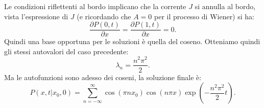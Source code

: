 \noindent
\begin{exmp}
    Le condizioni riflettenti al bordo implicano che la corrente $J$ si annulla al bordo, vista l'espressione di $J$ (e ricordando che $A=0$ per il processo di Wiener) si ha:
    \[
	\frac{\partial P(0,t) }{\partial x} = \frac{\partial P(1,t) }{\partial x} = 0
    .\] 
    Quindi una base opportuna per le soluzioni è quella del coseno. Otteniamo quindi gli stessi autovalori del caso precedente:
    \[
        \lambda_n = \frac{n^2\pi^2}{2}
    .\] 
    Ma le autofunzioni sono adesso dei coseni, la soluzione finale è:
    \[
	P(x,t|x_0, 0) = \sum_{n=-\infty}^{\infty} \cos (\pi nx_0) \cos (n\pi x) \exp\left(-\frac{n^2\pi^2 }{2}t\right)
    .\] 
\end{exmp}
\noindent
\clearpage
